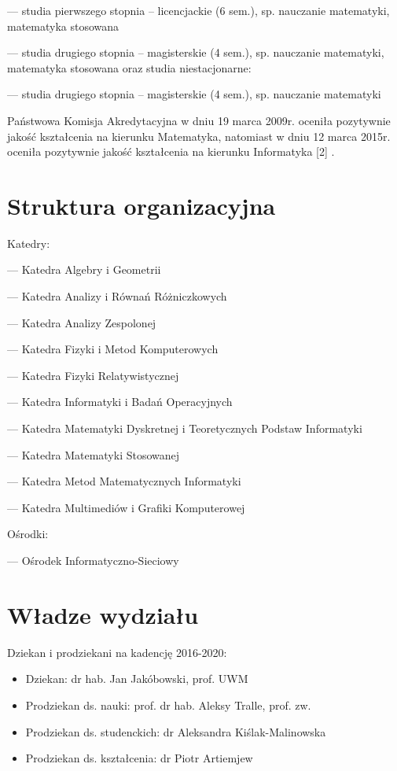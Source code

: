 \documentclass[a4paper,12pt]{article}
\begin{document}
--- studia pierwszego stopnia – licencjackie (6 sem.), sp. nauczanie matematyki, matematyka stosowana

--- studia drugiego stopnia – magisterskie (4 sem.), sp. nauczanie matematyki, matematyka stosowana
oraz studia niestacjonarne:

--- studia drugiego stopnia – magisterskie (4 sem.), sp. nauczanie matematyki

Państwowa Komisja Akredytacyjna w dniu 19 marca 2009r. oceniła pozytywnie jakość kształcenia na kierunku
Matematyka, natomiast w dniu 12 marca 2015r. oceniła pozytywnie jakość kształcenia na kierunku
Informatyka [2]
.

\section{Struktura organizacyjna}
Katedry:

--- Katedra Algebry i Geometrii

--- Katedra Analizy i Równań Różniczkowych

--- Katedra Analizy Zespolonej

--- Katedra Fizyki i Metod Komputerowych

--- Katedra Fizyki Relatywistycznej

--- Katedra Informatyki i Badań Operacyjnych

--- Katedra Matematyki Dyskretnej i Teoretycznych Podstaw Informatyki

--- Katedra Matematyki Stosowanej

--- Katedra Metod Matematycznych Informatyki

--- Katedra Multimediów i Grafiki Komputerowej

Ośrodki:

--- Ośrodek Informatyczno-Sieciowy
\section{Władze wydziału}
Dziekan i prodziekani na kadencję 2016-2020:
\begin{itemize} \itemsep1pt \parskip0pt 
\item  Dziekan: dr hab. Jan Jakóbowski, prof. UWM
\item  Prodziekan ds. nauki: prof. dr hab. Aleksy Tralle, prof. zw.
\item  Prodziekan ds. studenckich: dr Aleksandra Kiślak-Malinowska
\item  Prodziekan ds. kształcenia: dr Piotr Artiemjew

\end{itemize}
\end{document}
